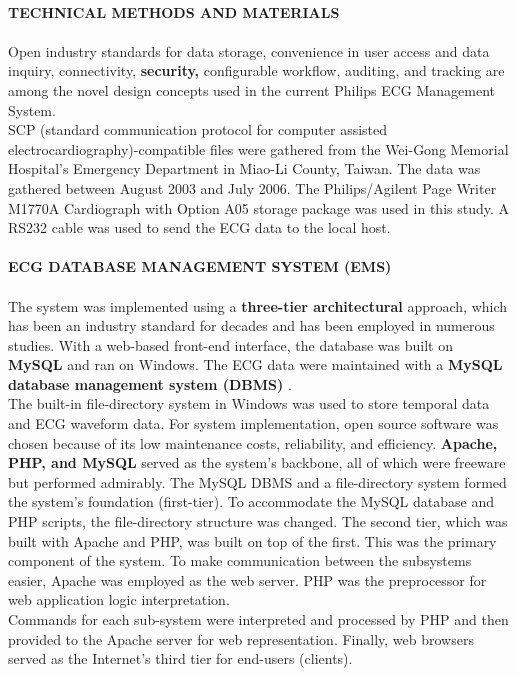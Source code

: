 \documentclass[12pt]{article}
\begin{document}
\paragraph{\textbf{TECHNICAL METHODS AND MATERIALS}}
\paragraph{}Open industry standards for data storage, convenience in user access and data inquiry, connectivity, \textbf{security,} configurable workflow, auditing, and tracking are among the novel design concepts used in the current Philips ECG Management System.\\ SCP (standard communication protocol for computer assisted electrocardiography)-compatible files were gathered from the Wei-Gong Memorial Hospital's Emergency Department in Miao-Li County, Taiwan. The data was gathered between August 2003 and July 2006. The Philips/Agilent Page Writer M1770A Cardiograph with Option A05 storage package was used in this study. A RS232 cable was used to send the ECG data to the local host.
\paragraph{\textbf{ECG DATABASE MANAGEMENT SYSTEM (EMS)}}
\paragraph{} The system was implemented using a \textbf{three-tier architectural} approach, which has been an industry standard for decades and has been employed in numerous studies. With a web-based front-end interface, the database was built on \textbf{MySQL} and ran on Windows. The ECG data were maintained with a \textbf{MySQL database management system (DBMS) }.\\ The built-in file-directory system in Windows was used to store temporal data and ECG waveform data. For system implementation, open source software was chosen because of its low maintenance costs, reliability, and efficiency. \textbf{Apache, PHP, and MySQL }served as the system's backbone, all of which were freeware but performed admirably. The MySQL DBMS and a file-directory system formed the system's foundation (first-tier). To accommodate the MySQL database and PHP scripts, the file-directory structure was changed. The second tier, which was built with Apache and PHP, was built on top of the first. This was the primary component of the system. To make communication between the subsystems easier, Apache was employed as the web server. PHP was the preprocessor for web application logic interpretation.\\ Commands for each sub-system were interpreted and processed by PHP and then provided to the Apache server for web representation. Finally, web browsers served as the Internet's third tier for end-users (clients).
\end{document}
